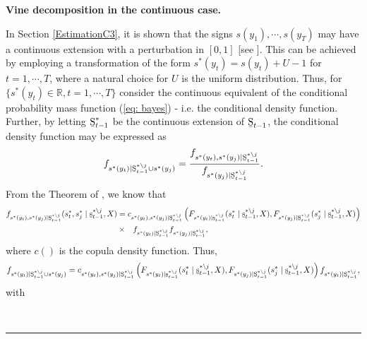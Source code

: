 \documentclass[harvard,11pt]{article}
\newenvironment{proof}[1][Proof]{\textbf{#1.} }{\  \rule{0.5em}{0.5em}}
\begin{document}
\begin{proof}[Vine decomposition in the continuous case]

In Section \ref{EstimationC3}, it is shown that the signs $s(y_1),\cdots,s(y_T)$ may have a continuous extension with a perturbation in $[0,1]$ [see \citet{denuit2005constraints}]. This can be achieved by employing a transformation of the form $s^*(y_t)=s(y_t)+U-1$ for $t=1,\cdots,T$, where a natural choice for $U$ is the uniform distribution. Thus, for $\{s^*(y_t)\in \mathbb{R},t=1,\cdots,T\}$ consider the continuous equivalent of the conditional probability mass function  (\ref{eq: bayes}) - i.e. the conditional density function. Further, by letting $\text{\b{S}}_{t-1}^{*}$ be the continuous extension of $\text{\b{S}}_{t-1}$, the conditional density function may be expressed as
\begin{equation}\label{eq: continuous}
f_{s^*(y_t)\mid \text{\b{S}}_{t-1}^{*\backslash j}\cup s^*(y_j)}=\frac{f_{s^*(y_t),s^*(y_j)\mid \text{\b{S}}_{t-1}^{*\backslash j}}}{f_{s^*(y_j)\mid \text{\b{S}}_{t-1}^{*\backslash j}}}.
\end{equation}
From the Theorem of \citet{sklar1959fonctions}, we know that
\begingroup
\allowdisplaybreaks
\begin{align}\label{eq: Sklar}
\begin{split}
f_{s^*(y_t),s^*(y_j)\mid \text{\b{S}}_{t-1}^{*\backslash j}}(s_t^*,s_j^*\mid \text{\b{s}}_{t-1}^{*\backslash j},X)&=c_{s^*(y_t),s^*(y_j)\mid \text{\b{S}}_{t-1}^{*\backslash j}}\left(F_{s^*(y_t)\mid\text{\b{s}}_{t-1}^{*\backslash j}}(s_t^*\mid \text{\b{s}}_{t-1}^{*\backslash j},X),F_{s^*(y_j)\mid\text{\b{S}}_{t-1}^{*\backslash j}}(s_j^*\mid \text{\b{s}}_{t-1}^{*\backslash j},X) \right)\\
&\times\textcolor{white}{=}f_{s^*(y_t)\mid \text{\b{S}}_{t-1}^{*\backslash j}}f_{s^*(y_j)\mid \text{\b{S}}_{t-1}^{*\backslash j}},
\end{split}
\end{align}
\endgroup
where $c()$ is the copula density function. Thus,
\begin{equation}
f_{s^*(y_t)\mid \text{\b{S}}_{t-1}^{*\backslash j}\cup s^*(y_j)}=c_{s^*(y_t),s^*(y_j)\mid \text{\b{S}}_{t-1}^{*\backslash j}}\left(F_{s^*(y_t)\mid\text{\b{s}}_{t-1}^{*\backslash j}}(s_t^*\mid \text{\b{s}}_{t-1}^{*\backslash j},X),F_{s^*(y_j)\mid\text{\b{S}}_{t-1}^{*\backslash j}}(s_j^*\mid \text{\b{s}}_{t-1}^{*\backslash j},X) \right)f_{s^*(y_t)\mid \text{\b{S}}_{t-1}^{*\backslash j}},
\end{equation}
with
\begingroup

\end{proof}
\end{document}
